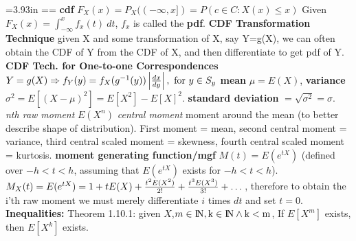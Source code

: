 =3.93in
=\vbox{\hsize=\strutA{\splittopskip}{0pt}%
%
%
%
%
{\bf cdf} $F_X(x) = P_X((-\infty,x])=P({c\in C : X(x)\le x})$\quad
Given $F_X(x) = \int_{-\infty}^xf_x(t)\ dt$, $f_x$ is called the {\bf pdf}.\quad
{\bf CDF Transformation Technique} given X and some transformation of X, say Y=g(X), we can often obtain the CDF of Y from the CDF of X, and then differentiate to get pdf of Y.\quad
{\bf CDF Tech. for One-to-one Correspondences} $Y=g(X) \Rightarrow f_Y(y) = f_X(g^{-1}(y)) \left|{dx \over dy}\right|,\ {\rm for}\ y \in S_y$\quad
{\bf mean} $\mu = E(X)$, {\bf variance} $\sigma^2=E[(X-\mu)^2]=E[X^2]-E[X]^2$. {\bf standard deviation } $=\sqrt{\sigma^2}=\sigma$.
{\it nth raw moment} $E(X^n)$ {\it central moment} moment around the mean (to better describe shape of distribution).
First moment = mean, second central moment = variance, third central scaled moment = skewness, fourth central scaled moment = kurtosis.
{\bf moment generating function/mgf } $M(t)=E(e^{tX})$ (defined over $-h < t < h$, assuming that $E(e^{tX})$ exists for $-h < t < h$).
$M_X(t)=E(e^{tX})=1+tE(X)+{t^2E(X^2) \over 2!} + {t^3E(X^3) \over 3!} + \dots$, therefore to obtain the i'th raw moment we must merely differentiate $i$ times $dt$ and set $t=0$.
{\bf Inequalities:} Theorem 1.10.1: given $X$,$m \in \rm I\!N, k \in \rm I\!N \land k < m$, If $E[X^m]$ exists, then $E[X^k]$ exists.\quad
}
